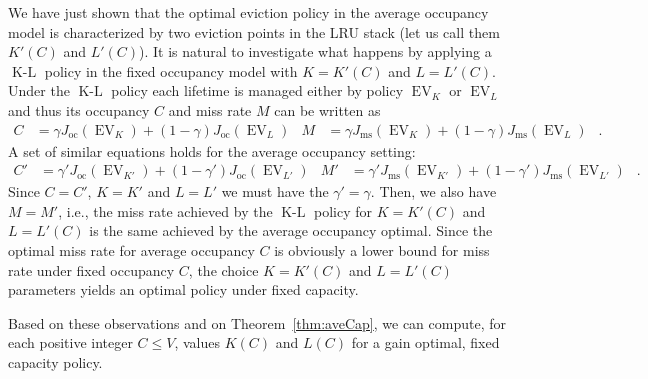 \documentclass[11pt,a4paper]{article}
\DeclareMathOperator{\oc}{oc}
\DeclareMathOperator{\ms}{ms}
\DeclareMathOperator{\ev}{EV}
\DeclareMathOperator{\kl}{K-L}
\DeclareMathOperator{\mf}{\enspace .}
\theoremstyle{definition}
\theoremstyle{remark}
\begin{document}
We have just shown that the optimal eviction policy in the average
occupancy model is characterized by two eviction points in the LRU
stack (let us call them $K'(C)$ and $L'(C)$). It is natural to
investigate what happens by applying a $\kl$ policy in the fixed
occupancy model with $K=K'(C)$ and $L=L'(C)$.  Under the $\kl$ policy
each lifetime is managed either by policy $\ev_K$ or $\ev_L$ and thus
its occupancy $C$ and miss rate $M$ can be written as
\begin{align}
  C &=\gamma J_{\oc}(\ev_K)+(1-\gamma)J_{\oc}(\ev_L) & 
  M &=\gamma J_{\ms}(\ev_K)+(1-\gamma)J_{\ms}(\ev_L) \mf
\end{align}
A set of similar equations holds for the average occupancy setting:
\begin{align}
  C' &=\gamma' J_{\oc}(\ev_{K'})+(1-\gamma')J_{\oc}(\ev_{L'}) & 
  M' &=\gamma' J_{\ms}(\ev_{K'})+(1-\gamma')J_{\ms}(\ev_{L'}) \mf
\end{align}
Since $C=C'$, $K=K'$ and $L=L'$ we must have the $\gamma'=\gamma$.
Then, we also have $M=M'$, i.e., the miss rate achieved by the $\kl$
policy for $K=K'(C)$ and $L=L'(C)$ is the same achieved by the average
occupancy optimal. Since the optimal miss rate for average occupancy
$C$ is obviously a lower bound for miss rate under fixed occupancy
$C$, the choice $K=K'(C)$ and $L=L'(C)$ parameters yields an optimal
policy under fixed capacity.

Based on these observations and on Theorem~\ref{thm:aveCap}, we can
compute, for each positive integer $C \leq V$, values $K(C)$ and
$L(C)$ for a gain optimal, fixed capacity policy.
\end{document}

